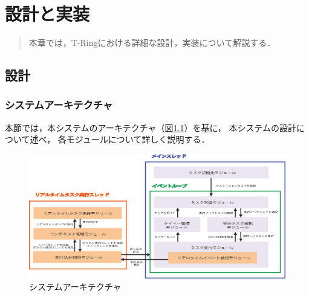 \chapter{設計と実装}
\begin{large}
\begin{quote}
本章では，T-Ringにおける詳細な設計，実装について解説する．
\end{quote}
\end{large}
\clearpage


\section{設計}
\subsection{システムアーキテクチャ}
本節では，本システムのアーキテクチャ（図\ref{fig:system_architecture}）を基に，
本システムの設計について述べ，
各モジュールについて詳しく説明する．


\begin{figure}[htbp]
 \begin{center}
  \includegraphics[width=150mm]{./images/system_architecture.eps}
 \end{center}
 \caption{システムアーキテクチャ}
 \label{fig:system_architecture}
\end{figure}


